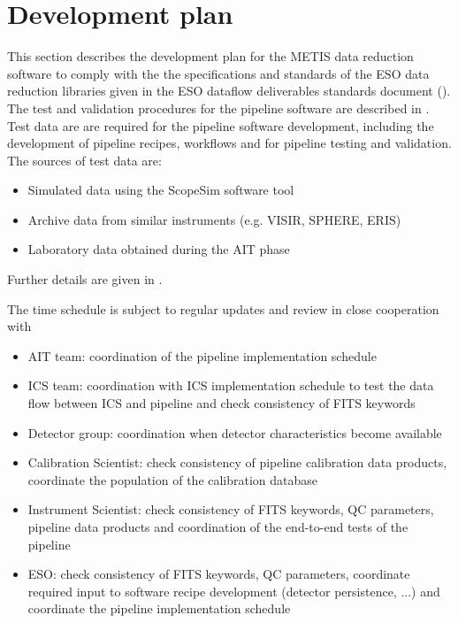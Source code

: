 \clearpage
\section{Development plan}\label{sec:development_plan}

This section describes the development plan for the METIS data reduction software to comply with the the specifications and standards of the ESO data reduction libraries given in the ESO dataflow deliverables standards document (\cite{1618}). The test and validation procedures for the pipeline software are described in \cite{DRLVT}. 
Test data are are required for the pipeline software development, including the development of pipeline recipes, workflows and for pipeline testing and validation. The sources of test data are:
\begin{itemize}
    \item Simulated data using the ScopeSim software tool
    \item Archive data from similar instruments (e.g. VISIR, SPHERE, ERIS)
    \item Laboratory data obtained during the AIT phase
\end{itemize}
Further details are given in \cite{DRLVT}.

The time schedule is subject to regular updates and review in close cooperation with

\begin{itemize}
    \item AIT team: coordination of the pipeline implementation schedule
    \item ICS team: coordination with ICS implementation schedule to test the data flow between ICS and pipeline and check consistency of FITS keywords
    \item Detector group: coordination when detector characteristics become available
    \item Calibration Scientist: check consistency of pipeline calibration data products, coordinate the population of the calibration database
    \item Instrument Scientist: check consistency of FITS keywords, QC parameters, pipeline data products and coordination of the end-to-end tests of the pipeline
    \item ESO: check consistency of FITS keywords, QC parameters, coordinate required input to software recipe development (detector persistence, ...) and coordinate the pipeline implementation schedule
\end{itemize}

